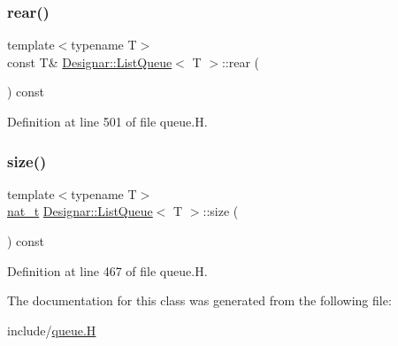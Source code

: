 \subsubsection{\texorpdfstring{rear()}{rear()}\hspace{0.1cm}{\footnotesize\ttfamily [2/2]}}
{\footnotesize\ttfamily template$<$typename T$>$ \\
const T\& \hyperlink{class_designar_1_1_list_queue}{Designar\+::\+List\+Queue}$<$ T $>$\+::rear (\begin{DoxyParamCaption}{ }\end{DoxyParamCaption}) const\hspace{0.3cm}{\ttfamily [inline]}}



Definition at line 501 of file queue.\+H.

\mbox{\label{class_designar_1_1_list_queue_a0a2d3a25c27b0529b1bcc4b0c0b27855}} 
\subsubsection{\texorpdfstring{size()}{size()}}
{\footnotesize\ttfamily template$<$typename T$>$ \\
\hyperlink{namespace_designar_aa72662848b9f4815e7bf31a7cf3e33d1}{nat\+\_\+t} \hyperlink{class_designar_1_1_list_queue}{Designar\+::\+List\+Queue}$<$ T $>$\+::size (\begin{DoxyParamCaption}{ }\end{DoxyParamCaption}) const\hspace{0.3cm}{\ttfamily [inline]}}



Definition at line 467 of file queue.\+H.



The documentation for this class was generated from the following file\+:\begin{DoxyCompactItemize}
\item 
include/\hyperlink{queue_8_h}{queue.\+H}\end{DoxyCompactItemize}
